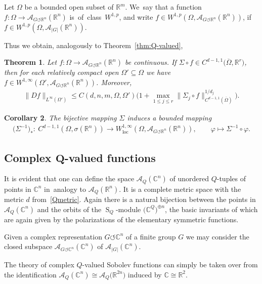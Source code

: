 \documentclass[pdftex]{sigma}
\numberwithin{equation}{section}
\newtheorem{Theorem}{Theorem}[section]
\newtheorem{Corollary}[Theorem]{Corollary}
\def\si{\sigma}
\def\vh{\varphi}
\def\Si{\Sigma}
\def\Om{\Omega}
\def\C{\mathbb{C}}
\def\R{\mathbb{R}}
\def\cA{\mathcal{A}}
\def\ol{\overline}
\renewcommand{\o}{\circ}
\def\acts{\circlearrowleft}
\let\on=\operatorname
\begin{document}
Let $\Om$ be a bounded open subset of $\R^m$. We~say that a function $f \colon \Om \to \cA_{G \acts \R^n}(\R^n)$ is~of~class~$W^{1,p}$,
and write $f \in W^{1,p}(\Om,\cA_{G \acts \R^n}(\R^n))$, if $f \in W^{1,p}(\Om,\cA_{|G|}(\R^n))$.


Thus we obtain, analogously to Theorem~\ref{thm:Q-valued},

\begin{Theorem}
 Let $f \colon \Om \to \cA_{G \acts \R^n}(\R^n)$ be continuous.
 If $\Si \o f \in C^{d-1,1}\big(\ol \Om,\R^r\big)$, then
 for each relatively compact open $\Om' \subseteq \Om$ we have
 $f \in W^{1,\infty}(\Om',\cA_{G \acts \R^n}(\R^n))$.
 Moreover,
 \begin{gather*}
 	\|D f\|_{L^\infty(\Om')} \le C(d,n,m,\Om,\Om') \Big(1 + \max_{1 \le j \le r} \|\Si_j \o f\|^{1/d_j}_{C^{d-1,1}(\ol \Om)}\Big).
 \end{gather*}
\end{Theorem}


\begin{Corollary}
 The bijective mapping $\Si$ induces a bounded mapping
 \begin{gather*}
 \big(\Si^{-1}\big)_* \colon\ C^{d-1,1}(\Om,\si(\R^n)) \to W^{1,\infty}_{\on{loc}}(\Om,\cA_{G \acts \R^n}(\R^n)),\qquad \vh \mapsto \Si^{-1} \o \vh.
 \end{gather*}
\end{Corollary}

\subsection[Complex Q-valued functions]{Complex $\boldsymbol Q$-valued functions}

It is evident that one can define the space $\cA_Q(\C^n)$ of unordered $Q$-tuples of points in $\C^n$ in~analogy to $\cA_Q(\R^n)$.
It is a complete metric space with the metric $d$ from~\eqref{Qmetric}.
Again there is a natural bijection between the points in $\cA_Q(\C^n)$ and the orbits of the $\on{S}_Q$-module $\big(\C^Q\big)^{\oplus n}$,
the basic invariants of which are again given by the polarizations of the elementary symmetric functions.

Given a complex representation $G \acts \C^n$ of a finite group $G$ we may consider the closed subspace $\cA_{G \acts \C^n}(\C^n)$
of $\cA_{|G|}(\C^n)$.

The theory of complex $Q$-valued Sobolev functions can simply be taken over from the identification
$\cA_Q(\C^n) \cong \cA_Q\big(\R^{2n}\big)$ induced by $\C \cong \R^2$.
\end{document}
